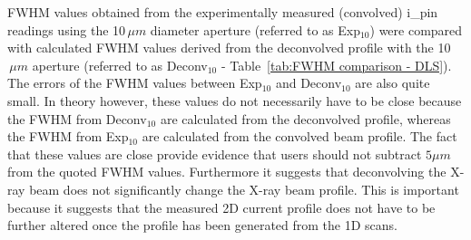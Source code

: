 FWHM values obtained from the experimentally measured (convolved) i\_pin readings using the 10$\,\mu m$ diameter aperture (referred to as Exp$_{\text{10}}$) were compared with calculated FWHM values derived from the deconvolved profile with the 10$\,\mu m$ aperture (referred to as Deconv$_{\text{10}}$ - Table~\ref{tab:FWHM comparison - DLS}).
The errors of the FWHM values between Exp$_{\text{10}}$ and Deconv$_{\text{10}}$ are also quite small.
In theory however, these values do not necessarily have to be close because the FWHM from Deconv$_{\text{10}}$ are calculated from the deconvolved profile, whereas the FWHM from Exp$_{\text{10}}$  are calculated from the convolved beam profile.
The fact that these values are close provide evidence that users should not subtract $5 \mu m$ from the quoted FWHM values.
Furthermore it suggests that deconvolving the X-ray beam does not significantly change the X-ray beam profile.
This is important because it suggests that the measured 2D current profile does not have to be further altered once the profile has been generated from the 1D scans.
